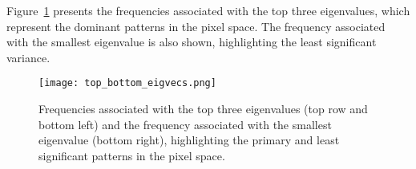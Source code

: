 \documentclass[12pt]{article}
\begin{document}
\FloatBarrier

Figure~\ref*{fig:top_bottom_eigvecs} presents the frequencies associated with the top three eigenvalues, which represent the dominant patterns in the pixel space. The frequency associated with the smallest eigenvalue is also shown, highlighting the least significant variance.

\begin{figure}[h!]
	\centering
	\texttt{[image: top\_bottom\_eigvecs.png]}
	\caption{Frequencies associated with the top three eigenvalues (top row and bottom left) and the frequency associated with the smallest eigenvalue (bottom right), highlighting the primary and least significant patterns in the pixel space.}
	\label{fig:top_bottom_eigvecs}
\end{figure}
\end{document}
